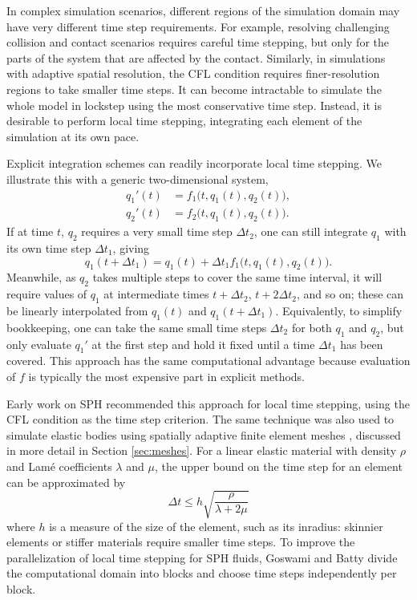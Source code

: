 In complex simulation scenarios, different regions of the simulation domain may have very different time step requirements.
For example, resolving challenging collision and contact scenarios requires careful time stepping, but only for the parts of the system that are affected by the contact.
Similarly, in simulations with adaptive spatial resolution, the CFL condition requires finer-resolution regions to take smaller time steps.
It can become intractable to simulate the whole model in lockstep using the most conservative time step.
Instead, it is desirable to perform local time stepping, integrating each element of the simulation at its own pace.

Explicit integration schemes can readily incorporate local time stepping.
We illustrate this with a generic two-dimensional system,
\begin{align}
  q_1'(t) &= f_1\big(t, q_1(t), q_2(t)\big), \\
  q_2'(t) &= f_2\big(t, q_1(t), q_2(t)\big).
\end{align}
If at time $t$, $q_2$ requires a very small time step $\Delta t_2$, one can still integrate $q_1$ with its own time step $\Delta t_1$, giving
\begin{equation}
  q_1(t+\Delta t_1) = q_1(t) + \Delta t_1 f_1\big(t, q_1(t), q_2(t)\big).
\end{equation}
Meanwhile, as $q_2$ takes multiple steps to cover the same time interval, it will require values of $q_1$ at intermediate times $t+\Delta t_2$, $t+2\Delta t_2$, and so on; these can be linearly interpolated from $q_1(t)$ and $q_1(t+\Delta t_1)$.
Equivalently, to simplify bookkeeping, one can take the same small time steps $\Delta t_2$ for both $q_1$ and $q_2$, but only evaluate $q_1'$ at the first step and hold it fixed until a time $\Delta t_1$ has been covered.
This approach has the same computational advantage because evaluation of $f$ is typically the most expensive part in explicit methods.

Early work on SPH \cite{Desbrun1996,Desbrun1999} recommended this approach for local time stepping, using the CFL condition as the time step criterion.
The same technique was also used to simulate elastic bodies using spatially adaptive finite element meshes \cite{Debunne2001}, discussed in more detail in Section \ref{sec:meshes}.
For a linear elastic material with density $\rho$ and Lam\'e coefficients $\lambda$ and $\mu$, the upper bound on the time step for an element can be approximated by
\begin{equation}
  \label{eq:cfl-fem}
  \Delta t \le h\sqrt{\frac\rho{\lambda+2\mu}}
\end{equation}
where $h$ is a measure of the size of the element, such as its inradius: skinnier elements or stiffer materials require smaller time steps.
To improve the parallelization of local time stepping for SPH fluids, Goswami and Batty \cite{Goswami2014} divide the computational domain into blocks and choose time steps independently per block.

